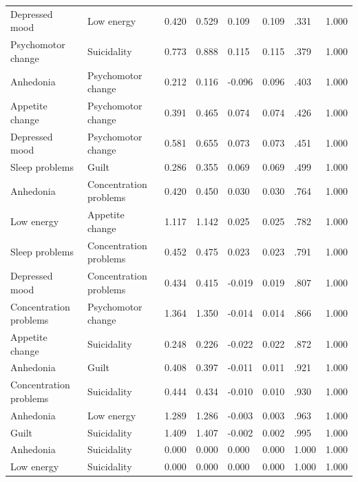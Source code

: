 \begin{longtable}[t]{llllllll}
Depressed mood & Low energy & 0.420 & 0.529 & 0.109 & 0.109 & .331 & 1.000\\
Psychomotor change & Suicidality & 0.773 & 0.888 & 0.115 & 0.115 & .379 & 1.000\\
Anhedonia & Psychomotor change & 0.212 & 0.116 & -0.096 & 0.096 & .403 & 1.000\\
Appetite change & Psychomotor change & 0.391 & 0.465 & 0.074 & 0.074 & .426 & 1.000\\
Depressed mood & Psychomotor change & 0.581 & 0.655 & 0.073 & 0.073 & .451 & 1.000\\
Sleep problems & Guilt & 0.286 & 0.355 & 0.069 & 0.069 & .499 & 1.000\\
Anhedonia & Concentration problems & 0.420 & 0.450 & 0.030 & 0.030 & .764 & 1.000\\
Low energy & Appetite change & 1.117 & 1.142 & 0.025 & 0.025 & .782 & 1.000\\
Sleep problems & Concentration problems & 0.452 & 0.475 & 0.023 & 0.023 & .791 & 1.000\\
Depressed mood & Concentration problems & 0.434 & 0.415 & -0.019 & 0.019 & .807 & 1.000\\
Concentration problems & Psychomotor change & 1.364 & 1.350 & -0.014 & 0.014 & .866 & 1.000\\
Appetite change & Suicidality & 0.248 & 0.226 & -0.022 & 0.022 & .872 & 1.000\\
Anhedonia & Guilt & 0.408 & 0.397 & -0.011 & 0.011 & .921 & 1.000\\
Concentration problems & Suicidality & 0.444 & 0.434 & -0.010 & 0.010 & .930 & 1.000\\
Anhedonia & Low energy & 1.289 & 1.286 & -0.003 & 0.003 & .963 & 1.000\\
Guilt & Suicidality & 1.409 & 1.407 & -0.002 & 0.002 & .995 & 1.000\\
Anhedonia & Suicidality & 0.000 & 0.000 & 0.000 & 0.000 & 1.000 & 1.000\\
Low energy & Suicidality & 0.000 & 0.000 & 0.000 & 0.000 & 1.000 & 1.000\\
\bottomrule
\end{longtable}
